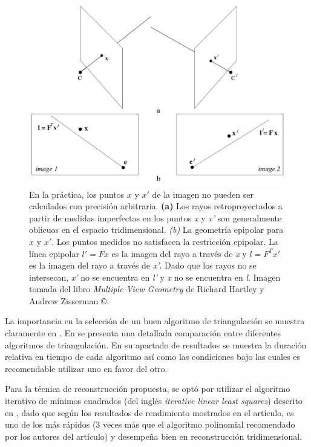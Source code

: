 \begin{figure}[H]
\centering
\includegraphics[width=1.0\textwidth]{images/realtriangulation.png}
\caption[Caso real del proceso de triangulaci\'{o}n]%
{En la pr\'{a}ctica, los puntos \textbf{\textit{$x$}} y \textbf{\textit{$x'$}} de la imagen no pueden ser calculados con precisi\'{o}n arbitraria. \textbf{(a)} Los rayos retroproyectados a partir de medidas imperfectas en los puntos \textit{x} y \textit{x'} son generalmente oblicuos en el espacio tridimensional. \textit{(b)} La geometr\'{i}a epipolar para \textbf{\textit{$x$}} y \textbf{\textit{$x'$}}. Los puntos medidos no satisfacen la restricci\'{o}n epipolar. La l\'{i}nea epipolar $l' = Fx$ es la imagen del rayo a trav\'{e}s de \textit{x} y $l = F^Tx'$ es la imagen del rayo a trav\'{e}s de \textit{x'}. Dado que los rayos no se intersecan, \textit{x'} no se encuentra en \textit{l'} y \textit{x} no se encuentra en \textit{l}. Imagen tomada del libro \textit{Multiple View Geometry} de Richard Hartley y Andrew Zisserman \copyright.}
\label{fig:RealTriangulation}
\end{figure}


La importancia en la selecci\'{o}n de un buen algoritmo de triangulaci\'{o}n se muestra claramente en \cite{Beardsley_Zisserman_Murray_1997,beardsley_etal_eccv1994}. En \cite{hartley1997triangulation} se presenta una detallada comparaci\'{o}n entre diferentes algoritmos de triangulaci\'{o}n. En su apartado de resultados se muestra la duraci\'{o}n relativa en tiempo de cada algoritmo as\'{i} como las condiciones bajo las cuales es recomendable utilizar uno en favor del otro. 

Para la t\'{e}cnica de reconstrucci\'{o}n propuesta, se opt\'{o} por utilizar el algoritmo iterativo de m\'{i}nimos cuadrados (del ingl\'{e}s \textit{iterative linear least squares}) descrito en \cite{hartley1997triangulation,Hartley_Zisserman_2003}, dado que seg\'{u}n los resultados de rendimiento mostrados en el art\'{i}culo, es uno de los m\'{a}s r\'{a}pidos (3 veces m\'{a}s que el algoritmo polinomial recomendado por los autores del art\'{i}culo) y desempe\~na bien en reconstrucci\'{o}n tridimensional.

